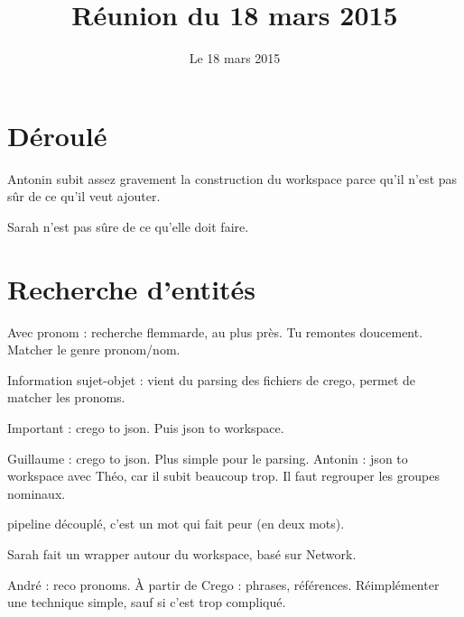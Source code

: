 \documentclass[a4paper,12pt]{article}
\title{Réunion du 18 mars 2015}
\author{\membres} %
\date{Le 18 mars 2015}
\begin{document}
\titrecourt %

\section{Déroulé}

Antonin subit assez gravement la construction du workspace parce qu'il n'est pas sûr de ce qu'il veut ajouter.

Sarah n'est pas sûre de ce qu'elle doit faire.

\section{Recherche d'entités}

Avec pronom : recherche flemmarde, au plus près.
Tu remontes doucement. Matcher le genre pronom/nom.

Information sujet-objet : vient du parsing des fichiers de crego, permet de matcher les pronoms.

Important : crego to json. Puis json to workspace.

Guillaume : crego to json. Plus simple pour le parsing.
Antonin : json to workspace avec Théo, car il subit beaucoup trop. Il faut regrouper les groupes nominaux.

pipeline découplé, c'est un mot qui fait peur (en deux mots).

Sarah fait un wrapper autour du workspace, basé sur Network.

André : reco pronoms. À partir de Crego : phrases, références.
Réimplémenter une technique simple, sauf si c'est trop compliqué.
\end{document}
